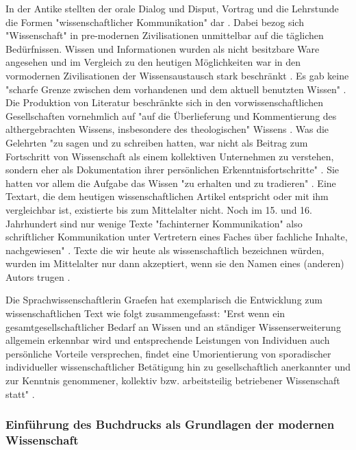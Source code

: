 In der Antike stellten der orale Dialog und Disput, Vortrag und die Lehrstunde die Formen "wissenschaftlicher Kommunikation" dar \cite{hollricher_wandel_2009}. Dabei bezog sich "Wissenschaft" in pre-modernen Zivilisationen unmittelbar auf die täglichen Bedürfnissen. Wissen und Informationen wurden als nicht besitzbare Ware angesehen \cite{cite:18} \cite{steiner_1998_autorenhonorar} und im Vergleich zu den heutigen Möglichkeiten war in den vormodernen Zivilisationen der Wissensaustausch stark beschränkt \cite{cite:17c}. Es gab keine "scharfe Grenze zwischen dem vorhandenen und dem aktuell benutzten Wissen" \cite{Luhmann1998}. Die Produktion von Literatur beschränkte sich in den vorwissenschaftlichen Gesellschaften vornehmlich auf "auf die Überlieferung und Kommentierung des althergebrachten Wissens, insbesondere des theologischen" Wissens \cite{steiner_1998_autorenhonorar}. Was die Gelehrten "zu sagen und zu schreiben hatten, war nicht als Beitrag zum Fortschritt von Wissenschaft als einem kollektiven Unternehmen zu verstehen, sondern eher als Dokumentation ihrer persönlichen Erkenntnisfortschritte" \cite{graefen2007_wissenschaftliche_artikel}. Sie hatten vor allem die Aufgabe das Wissen "zu erhalten und zu tradieren" \cite{Luhmann1998}. Eine Textart, die dem heutigen wissenschaftlichen Artikel entspricht oder mit ihm vergleichbar ist, existierte bis zum Mittelalter nicht. Noch im 15. und 16. Jahrhundert sind nur wenige Texte "fachinterner Kommunikation" also schriftlicher Kommunikation unter Vertretern eines Faches über fachliche Inhalte, nachgewiesen" \cite{graefen2007_wissenschaftliche_artikel}. Texte die wir heute als wissenschaftlich bezeichnen würden, wurden im Mittelalter nur dann akzeptiert, wenn sie den Namen eines (anderen) Autors trugen \cite{foucault_2000_autor}.

Die Sprachwissenschaftlerin Graefen hat exemplarisch die Entwicklung zum wissenschaftlichen Text wie folgt zusammengefasst: "Erst wenn ein gesamtgesellschaftlicher Bedarf an Wissen und an ständiger Wissenserweiterung allgemein erkennbar wird und entsprechende Leistungen von Individuen auch persönliche Vorteile versprechen, findet eine Umorientierung von sporadischer individueller wissenschaftlicher Betätigung hin zu gesellschaftlich anerkannter und zur Kenntnis genommener, kollektiv bzw. arbeitsteilig betriebener Wissenschaft statt" \cite{graefen2007_wissenschaftliche_artikel}.

\subsubsection{Einführung des Buchdrucks als Grundlagen der modernen Wissenschaft}

